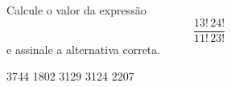 Calcule o valor da expressão \[\frac{13!\,24!}{11!\,23!}\] e assinale a alternativa correta.

3744
1802
3129
3124
2207



